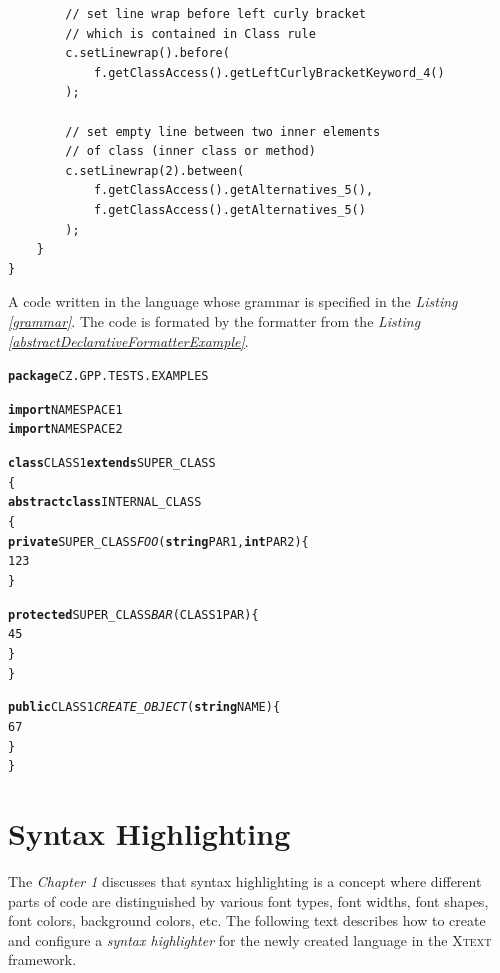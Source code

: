 \documentclass[12pt,notitlepage,a4paper]{report}
\begin{document}
\begin{expl}
\begin{verbatim}
        // set line wrap before left curly bracket
        // which is contained in Class rule
        c.setLinewrap().before(
            f.getClassAccess().getLeftCurlyBracketKeyword_4()
        );
		
        // set empty line between two inner elements
        // of class (inner class or method)
        c.setLinewrap(2).between(
            f.getClassAccess().getAlternatives_5(),
            f.getClassAccess().getAlternatives_5()
        );
    }
}
\end{verbatim}
\endgroup
\end{expl}



\begin{expl} \label{formattedCode}
A code written in the language whose grammar is specified in the \textit{Listing \ref{grammar}}. The code is formated by the formatter from the \textit{Listing \ref{abstractDeclarativeFormatterExample}}.
\begingroup
\fontsize{10pt}{12pt}
\begin{alltt}
\textbf{\color{keyword}package} CZ.GPP.TESTS.EXAMPLES

\textbf{\color{keyword}import} NAMESPACE1
\textbf{\color{keyword}import} NAMESPACE2

\textbf{\color{keyword}class} CLASS1 \textbf{\color{keyword}extends} SUPER_CLASS
\{
    \textbf{\color{keyword}abstract class} INTERNAL_CLASS
    \{
        \textbf{\color{keyword}private} SUPER_CLASS \textit{\color{method}FOO}(\textbf{\color{keyword}string} PAR1, \textbf{\color{keyword}int} PAR2)\{
            \textcolor{number}{1 2 3}
        \}

        \textbf{\color{keyword}protected} SUPER_CLASS \textit{\color{method}BAR}(CLASS1 PAR)\{
            \textcolor{number}{4 5}
        \}
    \}

    \textbf{\color{keyword}public} CLASS1 \textit{\color{method}CREATE_OBJECT}(\textbf{\color{keyword}string} NAME)\{
        \textcolor{number}{6 7}
    \}
\}
\end{alltt}
\endgroup
\end{expl}

\section {Syntax Highlighting}
\label{SyntaxHighlighting}
The \textit{Chapter 1} discusses that syntax highlighting is a concept where different parts of code are distinguished by various font types, font widths, font shapes, font colors, background colors, etc. The following text describes how to create and configure a \textit{syntax highlighter} for the newly created language in the \textsc{Xtext} framework. 
\end{document}
